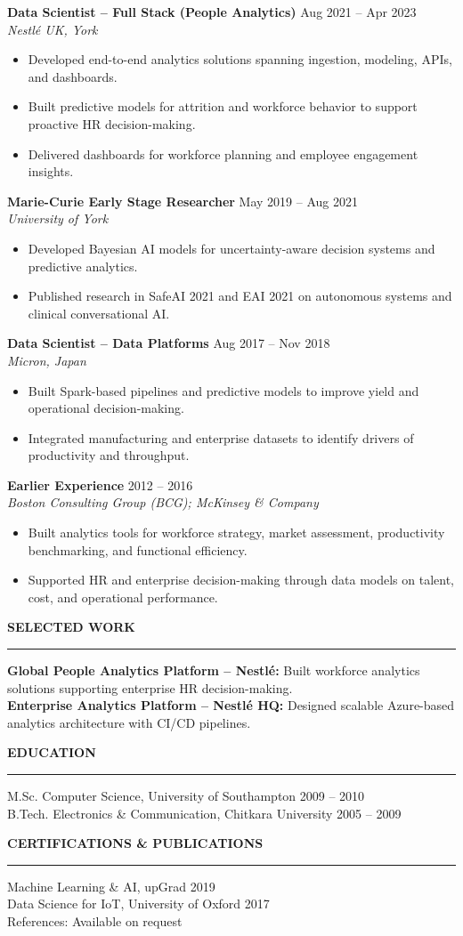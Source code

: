 \documentclass[10.5pt,a4paper]{article}
\newcommand{\sectionline}[1]{
\vspace{0.45em}
{\normalsize \textbf{\MakeUppercase{#1}}}\\[-0.45em]
\rule{\textwidth}{0.5pt}
\vspace{0.15em}
}
\begin{document}
\textbf{Data Scientist -- Full Stack (People Analytics)} \hfill Aug 2021 -- Apr 2023 \\
\textit{Nestlé UK, York}
\begin{itemize}
\item Developed end-to-end analytics solutions spanning ingestion, modeling, APIs, and dashboards.
\item Built predictive models for attrition and workforce behavior to support proactive HR decision-making.
\item Delivered dashboards for workforce planning and employee engagement insights.
\end{itemize}

\textbf{Marie-Curie Early Stage Researcher} \hfill May 2019 -- Aug 2021 \\
\textit{University of York}
\begin{itemize}
\item Developed Bayesian AI models for uncertainty-aware decision systems and predictive analytics.
\item Published research in SafeAI 2021 and EAI 2021 on autonomous systems and clinical conversational AI.
\end{itemize}

\textbf{Data Scientist -- Data Platforms} \hfill Aug 2017 -- Nov 2018 \\
\textit{Micron, Japan}
\begin{itemize}
\item Built Spark-based pipelines and predictive models to improve yield and operational decision-making.
\item Integrated manufacturing and enterprise datasets to identify drivers of productivity and throughput.
\end{itemize}

\textbf{Earlier Experience} \hfill 2012 -- 2016 \\
\textit{Boston Consulting Group (BCG); McKinsey \& Company}
\begin{itemize}
\item Built analytics tools for workforce strategy, market assessment, productivity benchmarking, and functional efficiency.
\item Supported HR and enterprise decision-making through data models on talent, cost, and operational performance.
\end{itemize}

\sectionline{Selected Work}
\textbf{Global People Analytics Platform -- Nestlé:} Built workforce analytics solutions supporting enterprise HR decision-making. \\
\textbf{Enterprise Analytics Platform -- Nestlé HQ:} Designed scalable Azure-based analytics architecture with CI/CD pipelines.

\sectionline{Education}
M.Sc. Computer Science, University of Southampton \hfill 2009 -- 2010 \\
B.Tech. Electronics \& Communication, Chitkara University \hfill 2005 -- 2009

\sectionline{Certifications \& Publications}
Machine Learning \& AI, upGrad \hfill 2019 \\
Data Science for IoT, University of Oxford \hfill 2017 \\
References: Available on request
\end{document}

